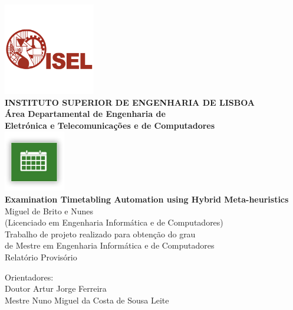 \begin{titlepage}
	\thispagestyle{empty}
	\begin{center}
		\includegraphics[width=0.3\textwidth,natwidth=720,natheight=434]{./images/isellogo.png} \\[0.5cm]
		{\Large \textbf{INSTITUTO SUPERIOR DE ENGENHARIA DE LISBOA}} \\[0.5cm]
		{\Large \textbf{Área Departamental de Engenharia de \\Eletrónica e Telecomunica\c cões e de Computadores}} \\[0.8cm]		
		\includegraphics[width=0.2\textwidth,natwidth=300,natheight=300]{./images/timetable.jpg} \\[0.8cm]
		\fontsize{18pt}{10pt}\selectfont
		{\textbf{Examination Timetabling Automation using Hybrid Meta-heuristics}} \\[0.8cm]
		\fontsize{16pt}{10pt}\selectfont
		Miguel de Brito e Nunes\\[0.2cm]
		\fontsize{14pt}{10pt}\selectfont
		(Licenciado em Engenharia Informática e de Computadores)\\[0.8cm]
		\fontsize{12pt}{10pt}\selectfont
		{Trabalho de projeto realizado para obten\c cão do grau\\de Mestre em Engenharia Informática e de Computadores} \\[0.8cm]
		\fontsize{16pt}{10pt}\selectfont
		Relatório Provisório
		\vfill
		\begin{tabbing}
		   \fontsize{12pt}{10pt}\selectfont
		   Orientadores: \\
		   \fontsize{11pt}{10pt}\selectfont
		   \hspace{1.1cm}Doutor Artur Jorge Ferreira \\
		   \fontsize{11pt}{10pt}\selectfont
		   \hspace{1.1cm}Mestre Nuno Miguel da Costa de Sousa Leite \\

\end{tabbing}
\end{center}
\end{titlepage}
